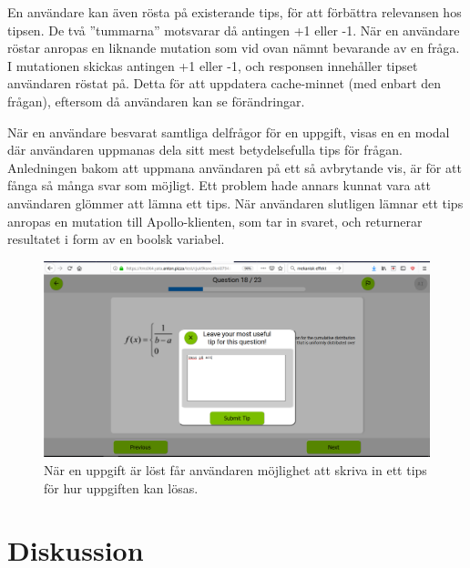 En användare kan även rösta på existerande tips, för att förbättra relevansen hos tipsen. De två ''tummarna'' motsvarar då antingen +1 eller -1. När en användare röstar anropas en liknande mutation som vid ovan nämnt bevarande av en fråga. I mutationen skickas antingen +1 eller -1, och responsen innehåller tipset användaren röstat på. Detta för att uppdatera cache-minnet (med enbart den frågan), eftersom då användaren kan se förändringar.

När en användare besvarat samtliga delfrågor för en uppgift, visas en en modal där användaren uppmanas dela sitt mest betydelsefulla tips för frågan. Anledningen bakom att uppmana användaren på ett så avbrytande vis, är för att fånga så många svar som möjligt. Ett problem hade annars kunnat vara att användaren glömmer att lämna ett tips. När användaren slutligen lämnar ett tips anropas en mutation till Apollo-klienten, som tar in svaret, och returnerar resultatet i form av en boolsk variabel.

\begin{center}
\begin{figure}[H]
    \centering
    \includegraphics[width=1.0\textwidth]{images/resultpictures/tipsfunktion2.png}
    \caption{När en uppgift är löst får användaren möjlighet att skriva in ett tips för hur uppgiften kan lösas.}
    \label{fig:raket7}
\end{figure}
\end{center}

\section{Diskussion}
\label{sec: webb-D}

